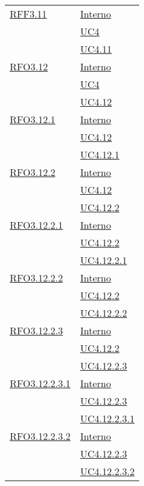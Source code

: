 \begin{longtable}{|>{\centering}m{5cm}|m{5cm}<{\centering}|}
\hyperlink{RFF3.11}{RFF3.11} &  \hyperlink{Interno}{Interno}\\ &\hyperref[UC4]{UC4}\\ &\hyperref[UC4.11]{UC4.11}\\ \hline

\hyperlink{RFO3.12}{RFO3.12} &  \hyperlink{Interno}{Interno}\\ &\hyperref[UC4]{UC4}\\ &\hyperref[UC4.12]{UC4.12}\\ \hline

\hyperlink{RFO3.12.1}{RFO3.12.1} & \hyperlink{Interno}{Interno}\\ &\hyperref[UC4.12]{UC4.12}\\ &\hyperref[UC4.12.1]{UC4.12.1}\\ \hline

\hyperlink{RFO3.12.2}{RFO3.12.2} & \hyperlink{Interno}{Interno}\\ &\hyperref[UC4.12]{UC4.12}\\ &\hyperref[UC4.12.2]{UC4.12.2}\\ \hline

\hyperlink{RFO3.12.2.1}{RFO3.12.2.1} & \hyperlink{Interno}{Interno}\\ &\hyperref[UC4.12.2]{UC4.12.2}\\ &\hyperref[UC4.12.2.1]{UC4.12.2.1}\\ \hline

\hyperlink{RFO3.12.2.2}{RFO3.12.2.2} &  \hyperlink{Interno}{Interno}\\ &\hyperref[UC4.12.2]{UC4.12.2}\\ &\hyperref[UC4.12.2.2]{UC4.12.2.2}\\ \hline

\hyperlink{RFO3.12.2.3}{RFO3.12.2.3} & \hyperlink{Interno}{Interno}\\ &\hyperref[UC4.12.2]{UC4.12.2}\\ &\hyperref[UC4.12.2.3]{UC4.12.2.3}\\ \hline

\hyperlink{RFO3.12.2.3.1}{RFO3.12.2.3.1} & \hyperlink{Interno}{Interno}\\ &\hyperref[UC4.12.2.3]{UC4.12.2.3}\\ &\hyperref[UC4.12.2.3.1]{UC4.12.2.3.1}\\ \hline

\hyperlink{RFO3.12.2.3.2}{RFO3.12.2.3.2} & \hyperlink{Interno}{Interno}\\ &\hyperref[UC4.12.2.3]{UC4.12.2.3}\\ &\hyperref[UC4.12.2.3.2]{UC4.12.2.3.2}\\ \hline


\end{longtable}
